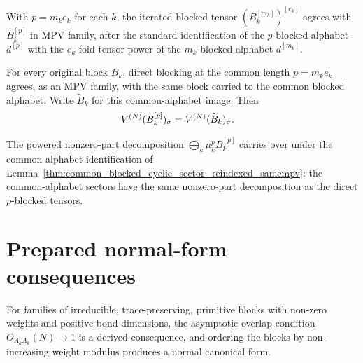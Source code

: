 \begin{lemma}%
    \label{thm:common_blocked_cyclic_sector_reindexed_samempv}
    \leanok
    With $p=m_ke_k$ for each $k$, the iterated blocked tensor
    $(B_k^{[m_k]})^{[e_k]}$ agrees with $B_k^{[p]}$ in MPV family, after the
    standard identification of the $p$-blocked alphabet $d^{[p]}$ with the
    $e_k$-fold tensor power of the $m_k$-blocked alphabet $d^{[m_k]}$.
\end{lemma}

\begin{lemma}%
    \label{thm:common_blocked_cyclic_sector_block_tensor_common_reindexed}
    \leanok
    For every original block $B_k$, direct blocking at the common length
    $p=m_ke_k$ agrees, as an MPV family, with the same block carried to the
    common blocked alphabet. Write $\widetilde{B}_k$ for this common-alphabet
    image. Then
    \begin{align}
        V^{(N)}(B_k^{[p]})_\sigma
         & =
        V^{(N)}(\widetilde{B}_k)_\sigma.
        \notag
    \end{align}
\end{lemma}

\begin{lemma}%
    \label{thm:common_blocked_cyclic_sector_reindexed_nonzero_part}
    \leanok
    The powered nonzero-part decomposition
    $\bigoplus_k\mu_k^pB_k^{[p]}$ carries over under the common-alphabet
    identification of
    Lemma~\ref{thm:common_blocked_cyclic_sector_reindexed_samempv}: the
    common-alphabet sectors have the same nonzero-part decomposition as the
    direct $p$-blocked tensors.
\end{lemma}

\section{Prepared normal-form consequences}
\label{sec:app_canonical_prepared_consequences}

For families of irreducible, trace-preserving, primitive blocks with non-zero
weights and positive bond dimensions, the asymptotic overlap condition
$O_{A_kA_k}(N)\to1$ is a derived consequence, and ordering the blocks by
non-increasing weight modulus produces a normal canonical form.

